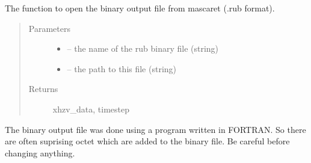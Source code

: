 \documentclass[letterpaper,10pt,english]{sphinxmanual}
\begin{document}

\begin{fulllineitems}
\label{\detokenize{index:src.mascaret.open_rub_file}}
The function to open the binary output file from mascaret (.rub format).
\begin{quote}\begin{description}
\item[{Parameters}] \leavevmode\begin{itemize}
\item {} 
 -- the name of the rub binary file (string)

\item {} 
 -- the path to this file (string)

\end{itemize}

\item[{Returns}] \leavevmode
xhzv\_data, timestep

\end{description}\end{quote}


The binary output file was done using a program written in FORTRAN. So there are often suprising
octet which are added to the binary file. Be careful before changing anything.

\end{fulllineitems}

\end{document}
